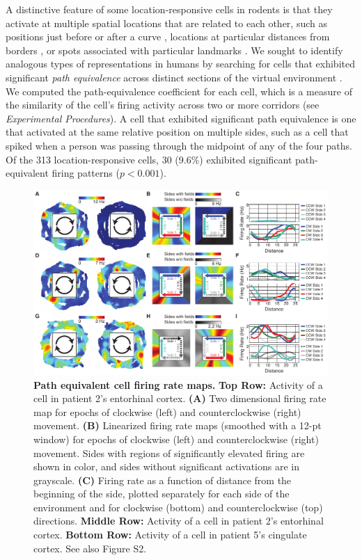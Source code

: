 A distinctive feature of some location-responsive cells in rodents is that they activate at multiple  spatial locations that are related to each other, such as positions just before or after a curve \cite{FranEtal00}, locations at particular distances from borders \cite{SolsEtal08,DerdEtal09,BjerEtal14}, or spots associated with particular landmarks \cite{HargEtal05,TsaoEtal13}.  We sought to identify analogous  types of representations in humans by searching for cells that exhibited significant \emph{path equivalence} across distinct sections of the virtual environment \cite{FranEtal00}.  We computed the path-equivalence coefficient for each cell, which is a measure of the similarity of the cell's firing activity across two or more corridors (see \emph{Experimental Procedures}).  A cell that exhibited significant path equivalence is one that activated at the same relative position on multiple sides, such as a cell that spiked when a person was passing through the midpoint of any of the four paths.  Of the 313 location-responsive cells, 30 (9.6\%) exhibited significant path-equivalent firing patterns ($p<0.001$).


\begin{figure}[t]
\centering
\includegraphics[width=.99\textwidth]{./tex/linearGrids/figs/Figure2}
\caption[Path equivalent cell firing rate maps]{\textbf{Path equivalent cell firing rate maps.} \textbf{Top Row:} Activity of a cell in patient 2's entorhinal cortex. \textbf{(A)} Two dimensional firing rate map for epochs of clockwise (left) and counterclockwise (right) movement. \textbf{(B)} Linearized firing rate maps (smoothed with a 12-pt window) for epochs of clockwise (left) and counterclockwise (right) movement. Sides with regions of significantly elevated firing are shown in color, and sides without significant activations are in grayscale. \textbf{(C)} Firing rate as a function of distance from the beginning of the side, plotted separately for each side of the environment and for clockwise (bottom) and counterclockwise (top) directions. \textbf{Middle Row:} Activity of a cell in patient 2's  entorhinal cortex. \textbf{Bottom Row:} Activity of a cell in patient 5's cingulate cortex. See also Figure S2.}
\label{fig:firingExamples}
\end{figure}

